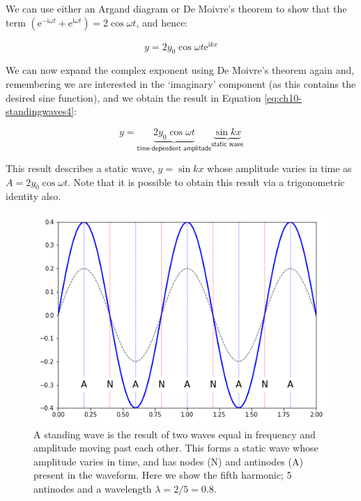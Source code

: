 \documentclass[
]{book}
\begin{document}
We can use either an Argand diagram or De Moivre's theorem to show that the term \(\left( \mathrm{e}^{-\mathrm{i}\omega t}+ \mathrm{e}^{\mathrm{i}\omega t} \right) = 2 \cos \omega t\), and hence:

\begin{equation}
y = 2 y_0 \cos \omega t \mathrm{e}^{\mathrm{i}kx}
\end{equation}

We can now expand the complex exponent using De Moivre's theorem again and, remembering we are interested in the `imaginary' component (as this contains the desired sine function), and we obtain the result in Equation \eqref{eq:ch10-standingwaves4}:

\begin{equation}
y = \underbrace{2 y_0 \cos \omega t}_{\textsf{time-dependent amplitude}} \underbrace{\sin kx}_{\textsf{static wave}}
\label{eq:ch10-standingwaves4}
\end{equation}

This result describes a static wave, \(y = \sin kx\) whose amplitude varies in time as \(A = 2 y_0 \cos \omega t\). Note that it is possible to obtain this result via a trigonometric identity also.

\begin{figure}

{\centering \includegraphics[width=0.7\linewidth]{visualisations/ch10-standingwave-n5} 

}

\caption{A standing wave is the result of two waves equal in frequency and amplitude moving past each other. This forms a static wave whose amplitude varies in time, and has nodes (N) and antinodes (A) present in the waveform. Here we show the fifth harmonic; 5 antinodes and a wavelength $\lambda = 2/5 = 0.8$.}\label{fig:ch10-standingwave1}
\end{figure}
\end{document}

